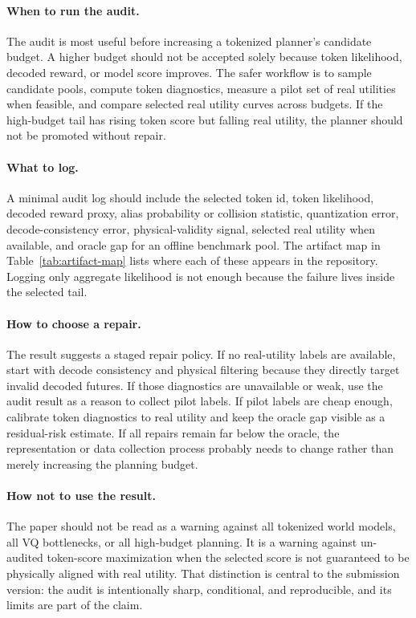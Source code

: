 \paragraph{When to run the audit.}
The audit is most useful before increasing a tokenized planner's candidate budget. A higher budget should not be accepted solely because token likelihood, decoded reward, or model score improves. The safer workflow is to sample candidate pools, compute token diagnostics, measure a pilot set of real utilities when feasible, and compare selected real utility curves across budgets. If the high-budget tail has rising token score but falling real utility, the planner should not be promoted without repair.

\paragraph{What to log.}
A minimal audit log should include the selected token id, token likelihood, decoded reward proxy, alias probability or collision statistic, quantization error, decode-consistency error, physical-validity signal, selected real utility when available, and oracle gap for an offline benchmark pool. The artifact map in Table~\ref{tab:artifact-map} lists where each of these appears in the repository. Logging only aggregate likelihood is not enough because the failure lives inside the selected tail.

\paragraph{How to choose a repair.}
The result suggests a staged repair policy. If no real-utility labels are available, start with decode consistency and physical filtering because they directly target invalid decoded futures. If those diagnostics are unavailable or weak, use the audit result as a reason to collect pilot labels. If pilot labels are cheap enough, calibrate token diagnostics to real utility and keep the oracle gap visible as a residual-risk estimate. If all repairs remain far below the oracle, the representation or data collection process probably needs to change rather than merely increasing the planning budget.

\paragraph{How not to use the result.}
The paper should not be read as a warning against all tokenized world models, all VQ bottlenecks, or all high-budget planning. It is a warning against un-audited token-score maximization when the selected score is not guaranteed to be physically aligned with real utility. That distinction is central to the submission version: the audit is intentionally sharp, conditional, and reproducible, and its limits are part of the claim.

